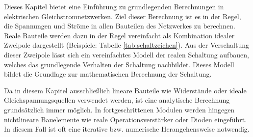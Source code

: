 {	Dieses Kapitel bietet eine Einführung zu grundlegenden Berechnungen in elektrischen Gleichstromnetzwerken.
	Ziel dieser Berechnung ist es in der Regel, die Spannungen und Ströme in allen Bauteilen des Netzwerkes
	zu berechnen. Reale Bauteile werden dazu in der Regel vereinfacht als Kombination idealer Zweipole dargestellt
	(Beispiele: Tabelle \ref{tab:schaltzeichen}). Aus der Verschaltung dieser 
	Zweipole lässt sich ein vereinfachtes Modell der realen Schaltung aufbauen, welches das grundlegende Verhalten der 
	Schaltung nachbildet.
	Dieses Modell bildet die Grundlage zur mathematischen Berechnung der Schaltung.
	
	
	Da in diesem Kapitel ausschließlich lineare Bauteile wie Widerstände oder ideale Gleichspannungsquellen verwendet werden, ist eine analytische 
	Berechnung grundsätzlich immer möglich. In fortgeschrittenen Modulen werden hingegen nichtlineare Bauelemente
	wie reale Operationsverstärker oder Dioden eingeführt. In diesem Fall ist oft eine iterative bzw. numerische Herangehensweise
	notwendig.
	
	
	
}





